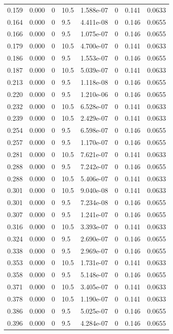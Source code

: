\documentclass[preview]{standalone}
\begin{document}
{{\begin{tabular}{L{1.2cm}C{1.2cm} C{0.3cm}C{0.5cm} C{1.4cm}C{1.4cm} C{1.4cm}C{1.4cm}}
  0.159  &  0.000  & 0     & 10.5 &  1.588e-07  & 0  & 0.141 &  0.0633   \\ 
  0.164  &  0.000  & 0     & 9.5 &  4.411e-08  & 0  & 0.146 &  0.0655   \\ 
  0.166  &  0.000  & 0     & 9.5 &  1.075e-07  & 0  & 0.146 &  0.0655   \\ 
  0.179  &  0.000  & 0     & 10.5 &  4.700e-07  & 0  & 0.141 &  0.0633   \\ 
  0.186  &  0.000  & 0     & 9.5 &  1.553e-07  & 0  & 0.146 &  0.0655   \\ 
  0.187  &  0.000  & 0     & 10.5 &  5.039e-07  & 0  & 0.141 &  0.0633   \\ 
  0.213  &  0.000  & 0     & 9.5 &  1.118e-08  & 0  & 0.146 &  0.0655   \\ 
  0.220  &  0.000  & 0     & 9.5 &  1.210e-06  & 0  & 0.146 &  0.0655   \\ 
  0.232  &  0.000  & 0     & 10.5 &  6.528e-07  & 0  & 0.141 &  0.0633   \\ 
  0.239  &  0.000  & 0     & 10.5 &  2.429e-07  & 0  & 0.141 &  0.0633   \\ 
  0.254  &  0.000  & 0     & 9.5 &  6.598e-07  & 0  & 0.146 &  0.0655   \\ 
  0.257  &  0.000  & 0     & 9.5 &  1.170e-07  & 0  & 0.146 &  0.0655   \\ 
  0.281  &  0.000  & 0     & 10.5 &  7.621e-07  & 0  & 0.141 &  0.0633   \\ 
  0.288  &  0.000  & 0     & 9.5 &  7.242e-07  & 0  & 0.146 &  0.0655   \\ 
  0.288  &  0.000  & 0     & 10.5 &  5.406e-07  & 0  & 0.141 &  0.0633   \\ 
  0.301  &  0.000  & 0     & 10.5 &  9.040e-08  & 0  & 0.141 &  0.0633   \\ 
  0.301  &  0.000  & 0     & 9.5 &  7.234e-08  & 0  & 0.146 &  0.0655   \\ 
  0.307  &  0.000  & 0     & 9.5 &  1.241e-07  & 0  & 0.146 &  0.0655   \\ 
  0.316  &  0.000  & 0     & 10.5 &  3.393e-07  & 0  & 0.141 &  0.0633   \\ 
  0.324  &  0.000  & 0     & 9.5 &  2.690e-07  & 0  & 0.146 &  0.0655   \\ 
  0.338  &  0.000  & 0     & 9.5 &  2.969e-07  & 0  & 0.146 &  0.0655   \\ 
  0.353  &  0.000  & 0     & 10.5 &  1.731e-07  & 0  & 0.141 &  0.0633   \\ 
  0.358  &  0.000  & 0     & 9.5 &  5.148e-07  & 0  & 0.146 &  0.0655   \\ 
  0.371  &  0.000  & 0     & 10.5 &  3.405e-07  & 0  & 0.141 &  0.0633   \\ 
  0.378  &  0.000  & 0     & 10.5 &  1.190e-07  & 0  & 0.141 &  0.0633   \\ 
  0.386  &  0.000  & 0     & 9.5 &  5.025e-07  & 0  & 0.146 &  0.0655   \\ 
  0.396  &  0.000  & 0     & 9.5 &  4.284e-07  & 0  & 0.146 &  0.0655   \\ 
\hline 
\end{tabular} 

}}
\end{document}
